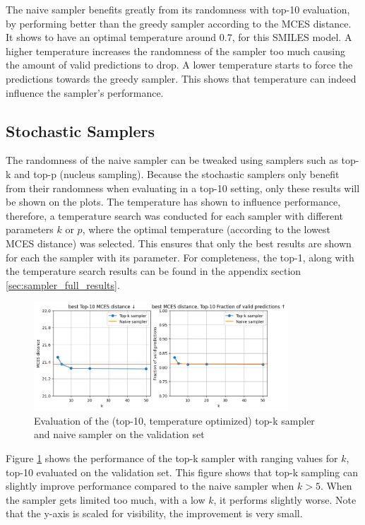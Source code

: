 The naive sampler benefits greatly from its randomness with top-10 evaluation, by performing better than the greedy sampler according to the MCES distance.
It shows to have an optimal temperature around $0.7$, for this SMILES model.
A higher temperature increases the randomness of the sampler too much causing the amount of valid predictions to drop.
A lower temperature starts to force the predictions towards the greedy sampler.
This shows that temperature can indeed influence the sampler's performance.

\subsection{Stochastic Samplers}

The randomness of the naive sampler can be tweaked using samplers such as top-k and top-p (nucleus sampling).
Because the stochastic samplers only benefit from their randomness when evaluating in a top-10 setting, only these results will be shown on the plots.
The temperature has shown to influence performance, therefore, a temperature search was conducted for each sampler with different parameters $k$ or $p$, where the optimal temperature (according to the lowest MCES distance) was selected.
This ensures that only the best results are shown for each the sampler with its parameter.
For completeness, the top-1, along with the temperature search results can be found in the appendix section \ref{sec:sampler_full_results}.

\begin{figure}[h]
    \centering
    \includegraphics[width=0.85\textwidth]{figures/results/samplers/top-k.png}
    \caption{Evaluation of the (top-10, temperature optimized) top-k sampler and naive sampler on the validation set}
    \label{fig:top-k}
\end{figure}

Figure \ref{fig:top-k} shows the performance of the top-k sampler with ranging values for $k$, top-10 evaluated on the validation set.
This figure shows that top-k sampling can slightly improve performance compared to the naive sampler when $k > 5$.
When the sampler gets limited too much, with a low $k$, it performs slightly worse. 
Note that the y-axis is scaled for visibility, the improvement is very small.

